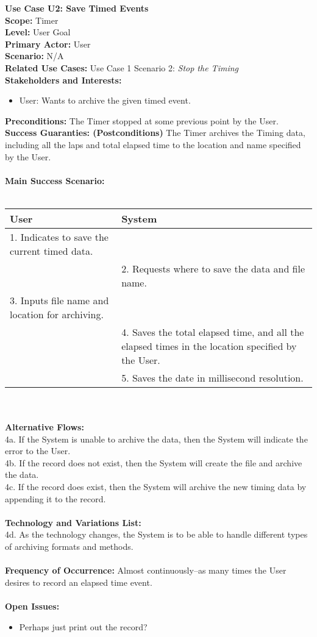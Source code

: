 \documentclass[letterpaper]{article}
\begin{document}
\noindent
\textbf{Use Case U2:  Save Timed Events}\\
\textbf{Scope:  }Timer\\
\textbf{Level:  }User Goal\\
\textbf{Primary Actor:  }User\\
\textbf{Scenario:  }N/A\\
\textbf{Related Use Cases:  }Use Case 1 Scenario 2:
\textit{Stop the Timing}\\
\textbf{Stakeholders and Interests:}
\begin{itemize}
\item User:  Wants to archive the given timed event.
\end{itemize}
\textbf{Preconditions:  }The Timer stopped at some previous
point by the User.\\
\textbf{Success Guaranties:  (Postconditions)} 
The Timer archives the Timing data, including all the laps and 
total elapsed time to the location and name specified by the User.\\\\
\textbf{Main Success Scenario: }\\\\
\begin{tabular}{|p{6cm}|p{6cm}|}\hline
\textbf{User} & \textbf{System}\\\hline
1.  Indicates to save the current timed data. & \\\hline
&2.  Requests where to save the data and file name.\\\hline
3.  Inputs file name and location for archiving. &\\\hline
&4.  Saves the total elapsed time, and all the elapsed times in the
location specified by the User.\\\hline
&5.  Saves the date in millisecond resolution.\\\hline
\end{tabular}\\\\
\textbf{Alternative Flows:  }\\
4a.  If the System is unable to archive the data, then the System will
indicate the error to the User.\\
4b.  If the record does not exist, then the System will create the
file and archive the data.\\
4c.  If the record does exist, then the System will archive the new
timing data by appending it to the record.\\\\
\textbf{Technology and Variations List:  }\\
4d.  As the technology changes, the System is to be able to handle
different types of archiving formats and methods.\\\\
\textbf{Frequency of Occurrence:  }Almost continuously--as many
times the User desires to record an elapsed time event.\\\\
\textbf{Open Issues:  }
\begin{itemize}
\item Perhaps just print out the record?
\end{itemize}
\end{document}
